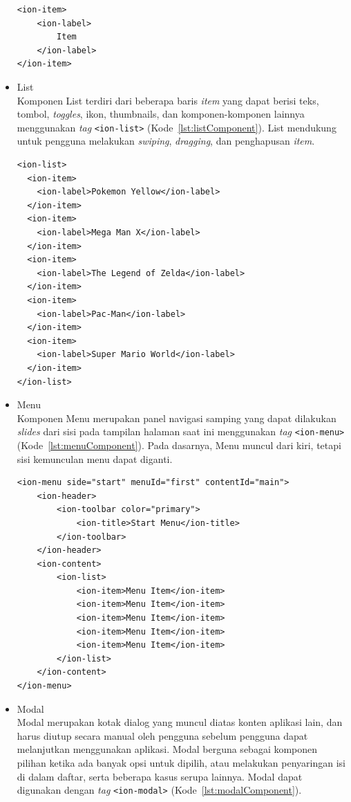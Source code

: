 \begin{itemize}
\begin{lstlisting}[label={lst:itemComponent}, caption=Potongan Kode Program dari Item Component]
<ion-item>
	<ion-label>
		Item
	</ion-label>
</ion-item>
\end{lstlisting} 
	
	\item List \\
	Komponen List terdiri dari beberapa baris \textit{item} yang dapat berisi teks, tombol, \textit{toggles}, ikon, thumbnails, dan komponen-komponen lainnya menggunakan \textit{tag} \texttt{<ion-list>} (Kode~\ref{lst:listComponent}). List mendukung untuk pengguna melakukan \textit{swiping}, \textit{dragging}, dan penghapusan \textit{item}. 
	
\begin{lstlisting}[label={lst:listComponent}, caption=Potongan Kode Program dari List Component]
<ion-list>
  <ion-item>
    <ion-label>Pokemon Yellow</ion-label>
  </ion-item>
  <ion-item>
    <ion-label>Mega Man X</ion-label>
  </ion-item>
  <ion-item>
    <ion-label>The Legend of Zelda</ion-label>
  </ion-item>
  <ion-item>
    <ion-label>Pac-Man</ion-label>
  </ion-item>
  <ion-item>
    <ion-label>Super Mario World</ion-label>
  </ion-item>
</ion-list>
\end{lstlisting} 		
	
	\item Menu \\
	Komponen Menu merupakan panel navigasi samping yang dapat dilakukan {\it slides} dari sisi pada tampilan halaman saat ini menggunakan {\it tag} \texttt{<ion-menu>} (Kode~\ref{lst:menuComponent}). Pada dasarnya, Menu muncul dari kiri, tetapi sisi kemunculan menu dapat diganti. 

\begin{lstlisting}[label={lst:menuComponent}, caption=Potongan Kode Program dari Menu Component]
<ion-menu side="start" menuId="first" contentId="main">
	<ion-header>
		<ion-toolbar color="primary">
			<ion-title>Start Menu</ion-title>
		</ion-toolbar>
	</ion-header>
	<ion-content>
		<ion-list>
			<ion-item>Menu Item</ion-item>
			<ion-item>Menu Item</ion-item>
			<ion-item>Menu Item</ion-item>
			<ion-item>Menu Item</ion-item>
			<ion-item>Menu Item</ion-item>
		</ion-list>
	</ion-content>
</ion-menu>
\end{lstlisting} 
	\item Modal \\
	Modal merupakan kotak dialog yang muncul diatas konten aplikasi lain, dan harus diutup secara manual oleh pengguna sebelum pengguna dapat melanjutkan menggunakan aplikasi. Modal berguna sebagai komponen pilihan ketika ada banyak opsi untuk dipilih, atau melakukan penyaringan isi di dalam daftar, serta beberapa kasus serupa lainnya. Modal dapat digunakan dengan \textit{tag} \texttt{<ion-modal>} (Kode~\ref{lst:modalComponent}).


\end{itemize}
